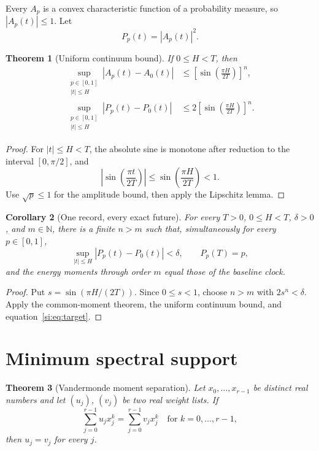 \documentclass[12pt]{article}
\newtheorem{theorem}{Theorem}[section]
\newtheorem{corollary}[theorem]{Corollary}
\begin{document}
Every \(A_p\) is a convex characteristic function of a probability measure,
so \(|A_p(t)|\leq1\). Let
\[
 P_p(t)=|A_p(t)|^2.
\]

\begin{theorem}[Uniform continuum bound]
If \(0\leq H<T\), then
\begin{align}
\sup_{\substack{p\in[0,1]\\|t|\leq H}}
 |A_p(t)-A_0(t)|
&\leq
\left[\sin\left(\frac{\pi H}{2T}\right)\right]^n,
\label{si:eq:ampwindow}\\
\sup_{\substack{p\in[0,1]\\|t|\leq H}}
 |P_p(t)-P_0(t)|
&\leq
2\left[\sin\left(\frac{\pi H}{2T}\right)\right]^n.
\label{si:eq:probwindow}
\end{align}
\end{theorem}

\begin{proof}
For \(|t|\leq H<T\), the absolute sine is monotone after reduction to the
interval \([0,\pi/2]\), and
\[
\left|\sin\left(\frac{\pi t}{2T}\right)\right|
\leq\sin\left(\frac{\pi H}{2T}\right)<1.
\]
Use \(\sqrt p\leq1\) for the amplitude bound, then apply the Lipschitz
lemma.
\end{proof}

\begin{corollary}[One record, every exact future]
For every \(T>0\), \(0\leq H<T\), \(\delta>0\), and \(m\in\mathbb N\),
there is a finite \(n>m\) such that, simultaneously for every \(p\in[0,1]\),
\[
\sup_{|t|\leq H}|P_p(t)-P_0(t)|<\delta,
\qquad P_p(T)=p,
\]
and the energy moments through order \(m\) equal those of the baseline
clock.
\end{corollary}

\begin{proof}
Put \(s=\sin(\pi H/(2T))\). Since \(0\leq s<1\), choose \(n>m\) with
\(2s^n<\delta\). Apply the common-moment theorem, the uniform continuum
bound, and equation~\eqref{si:eq:target}.
\end{proof}

\section{Minimum spectral support}

\begin{theorem}[Vandermonde moment separation]
Let \(x_0,\ldots,x_{r-1}\) be distinct real numbers and let
\((u_j)\), \((v_j)\) be two real weight lists. If
\[
\sum_{j=0}^{r-1}u_jx_j^k
=\sum_{j=0}^{r-1}v_jx_j^k
\quad\text{for }k=0,\ldots,r-1,
\]
then \(u_j=v_j\) for every \(j\).
\end{theorem}
\end{document}

